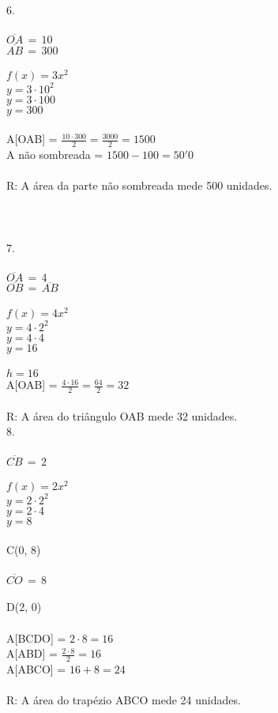 \documentclass[12pt]{article}
\begin{document}
6.\\\\
$\overline{OA}\,=\,10$\\
$\overline{AB}\,=\,300$\\\\
$f(x)=3x^2$\\
$y=3\cdot10^2$\\
$y=3\cdot100$\\
$y=300$\\\\
A[OAB] = $\frac{10\cdot300}{2}=\frac{3000}{2}=1500$\\
A não sombreada = $1500-100=50'0$\\\\
R: A área da parte não sombreada mede 500 unidades.\\\\\\\\

7.\\\\
$\overline{OA}\,=\,4$\\
$\overline{OB}\,=\,\overline{AB}$\\\\
$f(x)=4x^2$\\
$y=4\cdot2^2$\\
$y=4\cdot4$\\
$y=16$\\\\
$h = 16$\\
A[OAB] = $\frac{4\cdot16}{2}=\frac{64}{2}=32$\\\\
R: A área do triângulo OAB mede 32 unidades.\\

8.\\\\
$\overline{CB}\,=\,2$\\\\
$f(x)=2x^2$\\
$y=2\cdot2^2$\\
$y=2\cdot4$\\
$y=8$\\\\
C(0, 8)\\\\
$\overline{CO}\,=\,8$\\\\
D(2, 0)\\\\
A[BCDO] = $2\cdot8=16$\\
A[ABD] = $\frac{2\cdot8}{2}=16$\\
A[ABCO] = $16+8=24$\\\\
R: A área do trapézio ABCO mede 24 unidades.\\\\\\
\end{document}
